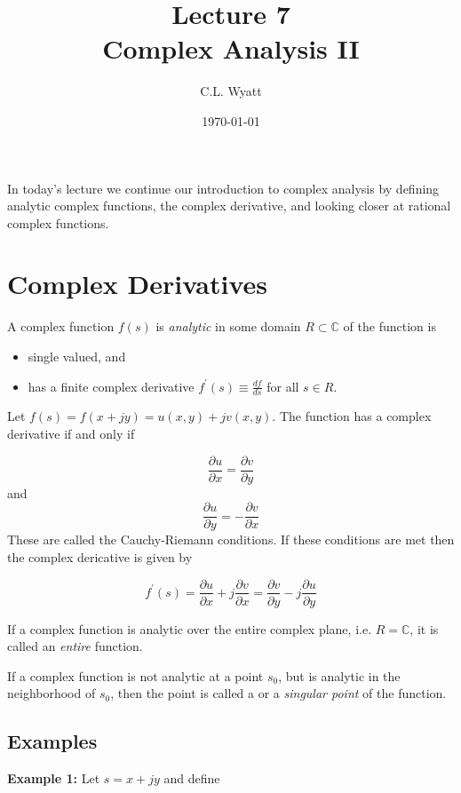 \documentclass{article}
\begin{document}
\title{Lecture 7\\ Complex Analysis II}
\author{C.L. Wyatt}
\date{\today}
\maketitle

In today's lecture we continue our introduction to complex analysis by defining analytic complex functions, the complex derivative, and looking closer at rational complex functions.

\section{Complex Derivatives}

A complex function $f(s)$ is \textit{analytic} in some domain $R\subset\mathbb{C}$ of the function is

\begin{itemize}
\item single valued, and
\item has a finite complex derivative $f^\prime(s) \equiv \frac{df}{ds}$ for all $s\in R$.
\end{itemize}

Let $f(s) = f(x + jy) = u(x,y) + jv(x,y)$. The function has a complex derivative if and only if

\[
\frac{\partial u}{\partial x} = \frac{\partial v}{\partial y}  
\]
and
\[
\frac{\partial u}{\partial y} = -\frac{\partial v}{\partial x}  
\]
These are called the Cauchy-Riemann conditions. If these conditions are met then the complex dericative is given by

\[
f^\prime(s) = \frac{\partial u}{\partial x} + j \frac{\partial v}{\partial x} = \frac{\partial v}{\partial y} - j \frac{\partial u}{\partial y}
\]

If a complex function is analytic over the entire complex plane, i.e. $R = \mathbb{C}$, it is called an \textit{entire} function.

If a complex function is not analytic at a point $s_0$, but is analytic in the neighborhood of $s_0$, then the point is called a  or a \textit{singular point} of the function.

\subsection{Examples}

\textbf{Example 1:} Let $s = x+jy$ and define
\end{document}
